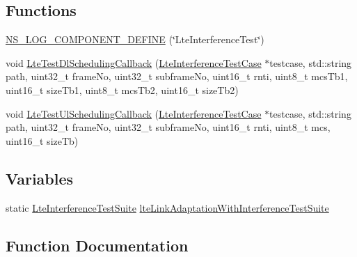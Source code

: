 \subsection*{Functions}
\begin{DoxyCompactItemize}
\item 
\hyperlink{lte-test-interference_8cc_aa1e921fd9976f483cd16dbd28f993a11}{N\+S\+\_\+\+L\+O\+G\+\_\+\+C\+O\+M\+P\+O\+N\+E\+N\+T\+\_\+\+D\+E\+F\+I\+NE} (\char`\"{}Lte\+Interference\+Test\char`\"{})
\item 
void \hyperlink{lte-test-interference_8cc_a8d6b465d93f1580062071ad34085009a}{Lte\+Test\+Dl\+Scheduling\+Callback} (\hyperlink{classLteInterferenceTestCase}{Lte\+Interference\+Test\+Case} $\ast$testcase, std\+::string path, uint32\+\_\+t frame\+No, uint32\+\_\+t subframe\+No, uint16\+\_\+t rnti, uint8\+\_\+t mcs\+Tb1, uint16\+\_\+t size\+Tb1, uint8\+\_\+t mcs\+Tb2, uint16\+\_\+t size\+Tb2)
\item 
void \hyperlink{lte-test-interference_8cc_a3af9ca9e1f1a2d5c2688b18891d5a9da}{Lte\+Test\+Ul\+Scheduling\+Callback} (\hyperlink{classLteInterferenceTestCase}{Lte\+Interference\+Test\+Case} $\ast$testcase, std\+::string path, uint32\+\_\+t frame\+No, uint32\+\_\+t subframe\+No, uint16\+\_\+t rnti, uint8\+\_\+t mcs, uint16\+\_\+t size\+Tb)
\end{DoxyCompactItemize}
\subsection*{Variables}
\begin{DoxyCompactItemize}
\item 
static \hyperlink{classLteInterferenceTestSuite}{Lte\+Interference\+Test\+Suite} \hyperlink{lte-test-interference_8cc_a5e7ef550267156f7d2f9c54e8b6ad5ca}{lte\+Link\+Adaptation\+With\+Interference\+Test\+Suite}
\end{DoxyCompactItemize}


\subsection{Function Documentation}
